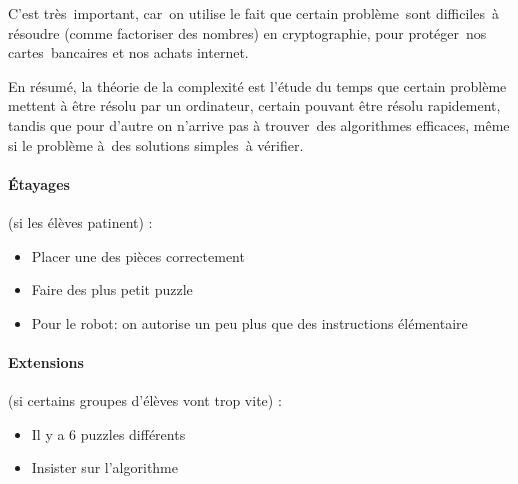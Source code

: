 \documentclass[12pt, a4paper]{article}
\begin{document}
C'est très important, car on utilise le fait que certain problème sont difficiles à résoudre (comme factoriser des nombres) en cryptographie, pour protéger nos cartes bancaires et nos achats internet.

En résumé, la théorie de la complexité est l'étude du temps que certain problème mettent à être résolu par un ordinateur, certain pouvant être résolu rapidement, tandis que pour d'autre on n'arrive pas à trouver des algorithmes efficaces, même si le problème à des solutions simples à vérifier.

	
	\paragraph*{Étayages} (si les élèves patinent) :
	\begin{itemize}
		\item Placer une des pièces correctement
		\item Faire des plus petit puzzle
		\item Pour le robot: on autorise un peu plus que des instructions élémentaire
	\end{itemize}
	
	\paragraph*{Extensions} (si certains groupes d'élèves vont trop vite) :
	\begin{itemize}
        \item Il y a 6 puzzles différents
		\item Insister sur l'algorithme
	\end{itemize}
\end{document}
